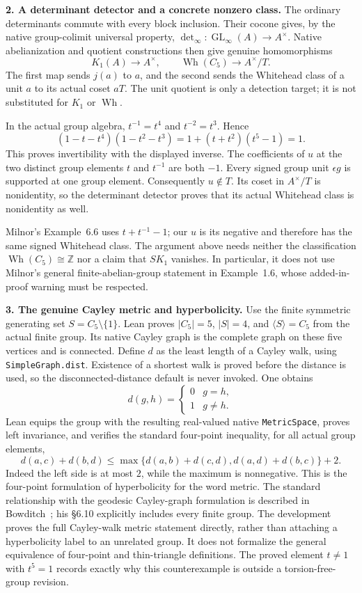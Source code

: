 \documentclass[10pt]{article}
\newcommand{\Z}{\mathbb Z}
\newcommand{\Wh}{\operatorname{Wh}}
\newcommand{\GL}{\operatorname{GL}}
\begin{document}
\textbf{2. A determinant detector and a concrete nonzero class.}
The ordinary determinants commute with every block inclusion. Their
cocone gives, by the native group-colimit universal property,
$\det_\infty:\GL_\infty(A)\to A^\times$. Native abelianization and
quotient constructions then give genuine homomorphisms
\[
 K_1(A)\longrightarrow A^\times,
 \qquad \Wh(C_5)\longrightarrow A^\times/T.
\]
The first map sends $j(a)$ to $a$, and the second sends the Whitehead
class of a unit $a$ to its actual coset $aT$. The unit quotient is
only a detection target; it is not substituted for $K_1$ or $\Wh$.

\newpage
In the actual group algebra, $t^{-1}=t^4$ and $t^{-2}=t^3$. Hence
\[
 (1-t-t^4)(1-t^2-t^3)
 =1+(t+t^2)(t^5-1)=1.
\]
This proves invertibility with the displayed inverse. The coefficients
of $u$ at the two distinct group elements $t$ and $t^{-1}$ are both
$-1$. Every signed group unit $\epsilon g$ is supported at one group
element. Consequently $u\notin T$. Its coset in $A^\times/T$ is
nonidentity, so the determinant detector proves that its actual
Whitehead class is nonidentity as well.

Milnor's Example~6.6 uses $t+t^{-1}-1$; our $u$ is its negative and
therefore has the same signed Whitehead class. The argument above
needs neither the classification $\Wh(C_5)\cong\Z$ nor a claim that
$SK_1$ vanishes. In particular, it does not use Milnor's general
finite-abelian-group statement in Example~1.6, whose added-in-proof
warning must be respected.

\textbf{3. The genuine Cayley metric and hyperbolicity.}
Use the finite symmetric generating set $S=C_5\setminus\{1\}$.
Lean proves $|C_5|=5$, $|S|=4$, and $\langle S\rangle=C_5$ from the
actual finite group. Its native Cayley graph is the complete graph
on these five vertices and is connected. Define $d$ as the least
length of a Cayley walk, using \texttt{SimpleGraph.dist}. Existence
of a shortest walk is proved before the distance is used, so the
disconnected-distance default is never invoked. One obtains
\[
 d(g,h)=\begin{cases}0&g=h,\\1&g\ne h.\end{cases}
\]
Lean equips the group with the resulting real-valued native
\texttt{MetricSpace}, proves left invariance, and verifies the standard
four-point inequality, for all actual group elements,
\[
 d(a,c)+d(b,d)\le
 \max\{d(a,b)+d(c,d),d(a,d)+d(b,c)\}+2.
\]
Indeed the left side is at most $2$, while the maximum is nonnegative.
This is the four-point formulation of hyperbolicity for the word
metric. The standard relationship with the geodesic Cayley-graph
formulation is described in Bowditch~\cite[\S\S2.3,6.5,6.10]{Bowditch};
his \S6.10 explicitly includes every finite group. The development
proves the full Cayley-walk metric statement directly, rather than
attaching a hyperbolicity label to an unrelated group. It does not
formalize the general equivalence of four-point and thin-triangle
definitions. The proved element $t\ne1$ with $t^5=1$ records exactly
why this counterexample is outside a torsion-free-group revision.
\end{document}
